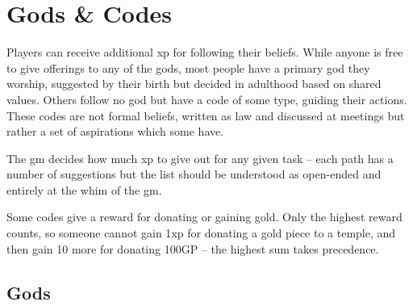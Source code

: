\chapter[Gods \& Codes]{Gods \& Codes}
\label{gods_codes}

\begin{multicols}{2}

\noindent
Players can receive additional \gls{xp} for following their beliefs.
While anyone is free to give offerings to any of the gods, most people have a primary god they worship, suggested by their birth but decided in adulthood based on shared values.
Others follow no god but have a code of some type, guiding their actions.
These codes are not formal beliefs, written as law and discussed at meetings but rather a set of aspirations which some have.

The \gls{gm} decides how much \gls{xp} to give out for any given task -- each path has a number of suggestions but the list should be understood as open-ended and entirely at the whim of the \gls{gm}.

Some codes give a reward for donating or gaining gold.  Only the highest reward counts, so someone cannot gain 1\gls{xp} for donating a gold piece to a temple, and then gain 10 more for donating 100GP -- the highest sum takes precedence.

\end{multicols}

\section{Gods}

